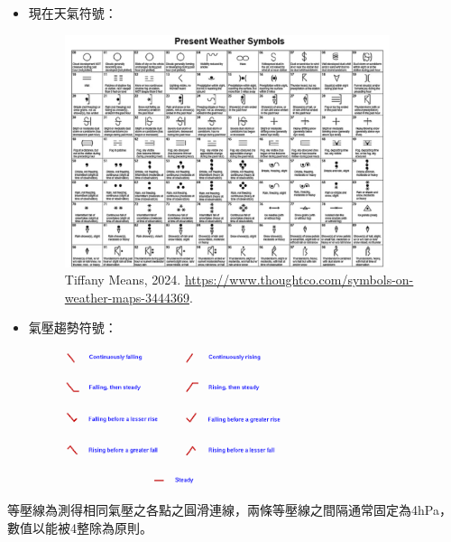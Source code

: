 \documentclass[a4paper,12pt]{report}
\begin{document}
\begin{itemize}
\begin{itemize}
\item 現在天氣符號：
\bct\begin{figure}[H]\ctr\includegraphics[width=0.9\textwidth]{weather.jpg}\caption{Tiffany Means, 2024. \href{https://www.thoughtco.com/symbols-on-weather-maps-3444369}{https://www.thoughtco.com/symbols-on-weather-maps-3444369}.}\end{figure}\FB\ect
\item 氣壓趨勢符號：
\bct\begin{figure}[H]\ctr\includegraphics[width=0.6\textwidth]{trend.png}\end{figure}\FB\ect
\end{itemize}
等壓線為測得相同氣壓之各點之圓滑連線，兩條等壓線之間隔通常固定為4hPa，數值以能被4整除為原則。


\end{itemize}
\end{document}
